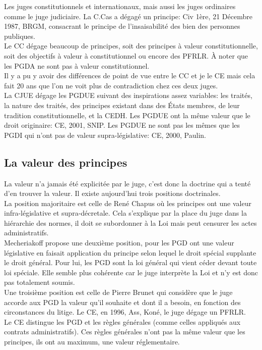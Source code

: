 \documentclass[10pt, a4paper, openany]{book}
\begin{document}
Les juges constitutionnels et internationaux, mais aussi les juges ordinaires comme le juge judiciaire. La C.Cas a dégagé un principe: Civ 1ère, 21 Décembre 1987, BRGM, consacrant le principe de l'insaisabilité des bien des personnes publiques. \\
Le CC dégage beaucoup de principes, soit des principes à valeur constitutionnelle, soit des objectifs à valeur à constitutionnel ou encore des PFRLR. À noter que les PGDA ne sont pas à valeur constitutionnel. \\
Il y a pu y avoir des différences de point de vue entre le CC et je le CE mais cela fait 20 ans que l'on ne voit plus de contradiction chez ces deux juges. \\
La CJUE dégage les PGDUE suivant des inspirations assez variables: les traités, la nature des traités, des principes existant dans des États membres, de leur tradition constitutionnelle, et la CEDH. Les PGDUE ont la même valeur que le droit originaire: CE, 2001, SNIP. Les PGDUE ne sont pas les mêmes que les PGDI qui n'ont pas de valeur supra-législative: CE, 2000, Paulin.

\subsection{La valeur des principes}

La valeur n'a jamais été explicitée par le juge, c'est donc la doctrine qui a tenté d'en trouver la valeur. Il existe aujourd'hui trois positions doctrinales. \\
La position majoritaire est celle de René Chapus où les principes ont une valeur infra-législative et supra-décretale. Cela s'explique par la place du juge dans la hiérarchie des normes, il doit se subordonner à la Loi mais peut censurer les actes administratifs. \\
Mecheriakoff propose une deuxième position, pour les PGD ont une valeur législative en faisait application du principe selon lequel le droit spécial supplante le droit général. Pour lui, les PGD sont la loi général qui vient céder devant toute loi spéciale. Elle semble plus cohérente car le juge interprète la Loi et n'y est donc pas totalement soumis. \\
Une troisième position est celle de Pierre Brunet qui considère que le juge accorde aux PGD la valeur qu'il souhaite et dont il a besoin, en fonction des circonstances du litige. Le CE, en 1996, Ass, Koné, le juge dégage un PFRLR. \\
Le CE distingue les  PGD et les règles générales (comme celles appliqués aux contrats administratifs). Ces règles générales n'ont pas la même valeur que les principes, ils ont au maximum, une valeur réglementaire. 
\end{document}
